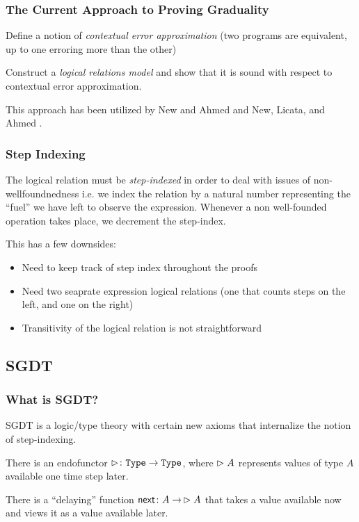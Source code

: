 \documentclass[
	11pt, %
]{beamer}
\begin{document}
\begin{frame}
	\frametitle{The Current Approach to Proving Graduality}

	Define a notion of \emph{contextual error approximation} (two programs are equivalent, up to one erroring more than the other)

	\medskip

	Construct a \emph{logical relations model} and show that it is sound with respect to contextual
	error approximation.

	\medskip

	This approach has been utilized by New and Ahmed \cite{NA2018} and New, Licata, and Ahmed \cite{NLA2019}.

\end{frame}

\begin{frame}
	\frametitle{Step Indexing}

	The logical relation must be \emph{step-indexed} in order to deal with issues of non-wellfoundnedness
	i.e. we index the relation by a natural number representing the ``fuel'' we have left to observe
	the expression.
	Whenever a non well-founded operation takes place, we decrement the step-index.

	\medskip

	This has a few downsides: 
	\begin{itemize}
		\item 	Need to keep track of step index throughout the proofs
		\item  	Need two seaprate expression logical relations (one that counts steps on the left,
		and one on the right)
		\item 	Transitivity of the logical relation is not straightforward
	\end{itemize}

\end{frame}

\subsection{SGDT}

\begin{frame}
	\frametitle{What is SGDT?}

	SGDT is a logic/type theory with certain new axioms that internalize the notion of step-indexing.

	\bigskip

	There is an endofunctor $\vartriangleright \colon \texttt{Type} \to \texttt{Type}$, where $\vartriangleright A$ represents
	values of type $A$ available one time step later.

	\medskip

	There is a ``delaying'' function $\mathsf{next} \colon A \to\, \vartriangleright A$ that takes a value available
	now and views it as a value available later.


\end{frame}
\end{document}
